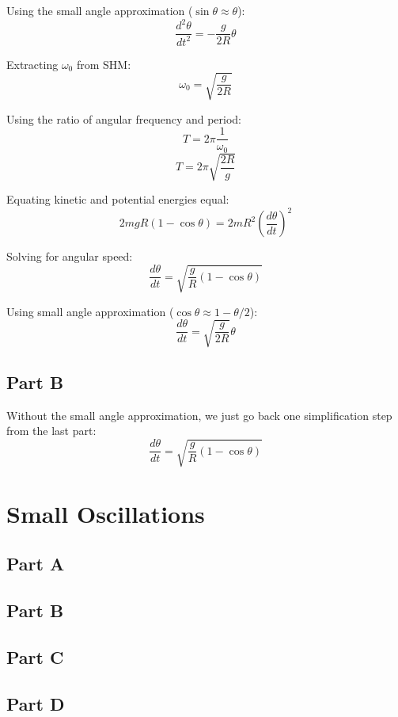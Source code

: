\documentclass{article}
\begin{document}
Using the small angle approximation ($\sin \theta \approx \theta$):
$$ \frac{ d^{2}\theta }{ dt^{2} } = -\frac{ g }{ 2 R } \theta $$

Extracting $\omega_{0}$ from SHM:
$$ \omega_{0} = \sqrt{ \frac{ g }{ 2 R } } $$

Using the ratio of angular frequency and period:
$$ T = 2 \pi \frac{ 1 }{ \omega_{0} } $$
$$ T = 2 \pi \sqrt{ \frac{ 2 R }{ g } } $$

Equating kinetic and potential energies equal:
$$ 2 m g R ( 1 - \cos \theta ) = 2 m R^{2} \left( \frac{ d\theta }{ dt }
\right)^{2} $$

Solving for angular speed:
$$ \frac{ d\theta }{ dt } = \sqrt{ \frac{ g }{ R } ( 1 - \cos \theta ) } $$

Using small angle approximation ($\cos \theta \approx 1 - \theta / 2$):
$$ \frac{ d\theta }{ dt } = \sqrt{ \frac{ g }{ 2 R } } \theta $$

\subsection{ Part B }

Without the small angle approximation, we just go back one simplification step
from the last part:
$$ \frac{ d\theta }{ dt } = \sqrt{ \frac{ g }{ R } ( 1 - \cos \theta ) } $$

\section{ Small Oscillations }

\subsection*{ Part A }



\subsection*{ Part B }



\subsection*{ Part C }



\subsection*{ Part D }
\end{document}
